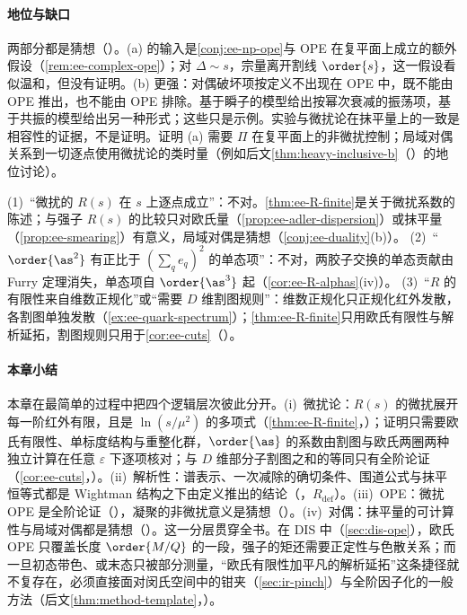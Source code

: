 \paragraph{地位与缺口}两部分都是猜想（\tagC）。(a) 的输入是\cref{conj:ee-np-ope}与 OPE 在复平面上成立的额外假设（\cref{rem:ee-complex-ope}）；对 $\Delta\sim s$，宗量离开割线 $\order{s}$，这一假设看似温和，但没有证明。(b) 更强：对偶破坏项按定义不出现在 OPE 中，既不能由 OPE 推出，也不能由 OPE 排除。基于瞬子的模型给出按幂次衰减的振荡项，基于共振的模型给出另一种形式；这些只是示例\cite{Shifman2000}。实验与微扰论在抹平量上的一致是相容性的证据，不是证明。证明 (a) 需要 $\Pi$ 在复平面上的非微扰控制；局域对偶关系到一切逐点使用微扰论的类时量（例如后文\cref{thm:heavy-inclusive-b}（\tagA）的地位讨论）。

\begin{remark}[常见误解]\label{rem:ee-misconceptions}
(1)~“微扰的 $R(s)$ 在 $s$ 上逐点成立”：不对。\cref{thm:ee-R-finite}是关于微扰系数的陈述；与强子 $R(s)$ 的比较只对欧氏量（\cref{prop:ee-adler-dispersion}）或抹平量（\cref{prop:ee-smearing}）有意义，局域对偶是猜想（\cref{conj:ee-duality}(b)）。
(2)~“$\order{\as^2}$ 有正比于 $(\sum_qe_q)^2$ 的单态项”：不对，两胶子交换的单态贡献由 Furry 定理消失，单态项自 $\order{\as^3}$ 起（\cref{cor:ee-R-alphas}(iv)）。
(3)~“$R$ 的有限性来自维数正规化”或“需要 $D$ 维割图规则”：维数正规化只正规化红外发散，各割图单独发散（\cref{ex:ee-quark-spectrum}）；\cref{thm:ee-R-finite}只用欧氏有限性与解析延拓，割图规则只用于\cref{cor:ee-cuts}（\tagA）。
\end{remark}

\paragraph{本章小结}本章在最简单的过程中把四个逻辑层次彼此分开。(i)~微扰论：$R(s)$ 的微扰展开每一阶红外有限，且是 $\ln(s/\mu^2)$ 的多项式（\cref{thm:ee-R-finite}，\tagR）；证明只需要欧氏有限性、单标度结构与重整化群，$\order{\as}$ 的系数由割图与欧氏两圈两种独立计算在任意 $\varepsilon$ 下逐项核对；与 $D$ 维部分子割图之和的等同只有全阶论证（\cref{cor:ee-cuts}，\tagA）。(ii)~解析性：谱表示、一次减除的确切条件、围道公式与抹平恒等式都是 Wightman 结构之下由定义推出的结论（\tagR，$R_{\mathrm{def}}$）。(iii)~OPE：微扰 OPE 是全阶论证（\tagA），凝聚的非微扰意义是猜想（\tagC）。(iv)~对偶：抹平量的可计算性与局域对偶都是猜想（\tagC）。这一分层贯穿全书。在 DIS 中（\cref{sec:dis-ope}），欧氏 OPE 只覆盖长度 $\order{M/Q}$ 的一段，强子的矩还需要正定性与色散关系；而一旦初态带色、或末态只被部分测量，“欧氏有限性加平凡的解析延拓”这条捷径就不复存在，必须直接面对闵氏空间中的钳夹（\cref{sec:ir-pinch}）与全阶因子化的一般方法（后文\cref{thm:method-template}，\tagA）。

